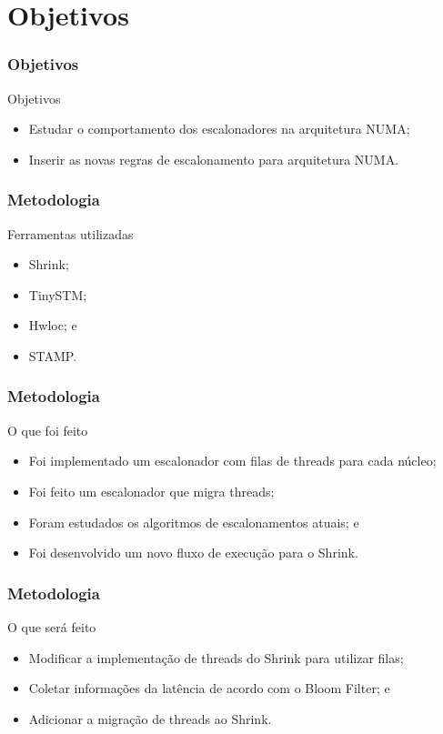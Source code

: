 \documentclass[10pt, pdf,xcolor=pdftex,dvipsnames,table]{beamer}
\begin{document}
\section{Objetivos}
\begin{frame} \frametitle{Objetivos}
\begin{block}{Objetivos}
\begin{itemize}
	\item Estudar o comportamento dos escalonadores na arquitetura NUMA;
	\item Inserir as novas regras de escalonamento para arquitetura NUMA.
\end{itemize}
\end{block}
\end{frame}

\begin{frame} \frametitle{Metodologia}
    \begin{block}{Ferramentas utilizadas}
        \begin{itemize}
        	\item Shrink;
        	\item TinySTM;
        	\item Hwloc; e
        	\item STAMP.
        \end{itemize}
    \end{block}
\end{frame}

\begin{frame} \frametitle{Metodologia}
\begin{block}{O que foi feito}
    \begin{itemize}
        \item Foi implementado um escalonador com filas de threads para cada núcleo;
        \item Foi feito um escalonador que migra threads;
    	\item Foram estudados os algoritmos de escalonamentos atuais; e
    	\item Foi desenvolvido um novo fluxo de execução para o Shrink.
    \end{itemize}
\end{block}
\end{frame}

\begin{frame} \frametitle{Metodologia}
\begin{block}{O que será feito}
\begin{itemize}
	\item Modificar a implementação de threads do Shrink para utilizar filas;
	\item Coletar informações da latência de acordo com o Bloom Filter; e
	\item Adicionar a migração de threads ao Shrink.
\end{itemize}
\end{block}
\end{frame}
\end{document}

